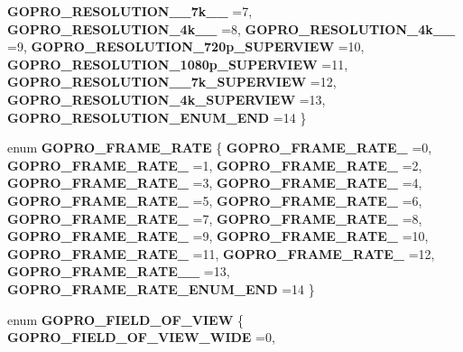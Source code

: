 \begin{DoxyCompactItemize}
\textbf{ G\+O\+P\+R\+O\+\_\+\+R\+E\+S\+O\+L\+U\+T\+I\+O\+N\+\_\+\_\+7k\+\_\+\_} =7, 
\newline
\textbf{ G\+O\+P\+R\+O\+\_\+\+R\+E\+S\+O\+L\+U\+T\+I\+O\+N\+\_\+4k\+\_\+\_} =8, 
\textbf{ G\+O\+P\+R\+O\+\_\+\+R\+E\+S\+O\+L\+U\+T\+I\+O\+N\+\_\+4k\+\_\+\_} =9, 
\textbf{ G\+O\+P\+R\+O\+\_\+\+R\+E\+S\+O\+L\+U\+T\+I\+O\+N\+\_\+720p\+\_\+\+S\+U\+P\+E\+R\+V\+I\+EW} =10, 
\textbf{ G\+O\+P\+R\+O\+\_\+\+R\+E\+S\+O\+L\+U\+T\+I\+O\+N\+\_\+1080p\+\_\+\+S\+U\+P\+E\+R\+V\+I\+EW} =11, 
\newline
\textbf{ G\+O\+P\+R\+O\+\_\+\+R\+E\+S\+O\+L\+U\+T\+I\+O\+N\+\_\+\_\+7k\+\_\+\+S\+U\+P\+E\+R\+V\+I\+EW} =12, 
\textbf{ G\+O\+P\+R\+O\+\_\+\+R\+E\+S\+O\+L\+U\+T\+I\+O\+N\+\_\+4k\+\_\+\+S\+U\+P\+E\+R\+V\+I\+EW} =13, 
\textbf{ G\+O\+P\+R\+O\+\_\+\+R\+E\+S\+O\+L\+U\+T\+I\+O\+N\+\_\+\+E\+N\+U\+M\+\_\+\+E\+ND} =14
 \}
\item 
enum \textbf{ G\+O\+P\+R\+O\+\_\+\+F\+R\+A\+M\+E\+\_\+\+R\+A\+TE} \{ \newline
\textbf{ G\+O\+P\+R\+O\+\_\+\+F\+R\+A\+M\+E\+\_\+\+R\+A\+T\+E\+\_} =0, 
\textbf{ G\+O\+P\+R\+O\+\_\+\+F\+R\+A\+M\+E\+\_\+\+R\+A\+T\+E\+\_} =1, 
\textbf{ G\+O\+P\+R\+O\+\_\+\+F\+R\+A\+M\+E\+\_\+\+R\+A\+T\+E\+\_} =2, 
\textbf{ G\+O\+P\+R\+O\+\_\+\+F\+R\+A\+M\+E\+\_\+\+R\+A\+T\+E\+\_} =3, 
\newline
\textbf{ G\+O\+P\+R\+O\+\_\+\+F\+R\+A\+M\+E\+\_\+\+R\+A\+T\+E\+\_} =4, 
\textbf{ G\+O\+P\+R\+O\+\_\+\+F\+R\+A\+M\+E\+\_\+\+R\+A\+T\+E\+\_} =5, 
\textbf{ G\+O\+P\+R\+O\+\_\+\+F\+R\+A\+M\+E\+\_\+\+R\+A\+T\+E\+\_} =6, 
\textbf{ G\+O\+P\+R\+O\+\_\+\+F\+R\+A\+M\+E\+\_\+\+R\+A\+T\+E\+\_} =7, 
\newline
\textbf{ G\+O\+P\+R\+O\+\_\+\+F\+R\+A\+M\+E\+\_\+\+R\+A\+T\+E\+\_} =8, 
\textbf{ G\+O\+P\+R\+O\+\_\+\+F\+R\+A\+M\+E\+\_\+\+R\+A\+T\+E\+\_} =9, 
\textbf{ G\+O\+P\+R\+O\+\_\+\+F\+R\+A\+M\+E\+\_\+\+R\+A\+T\+E\+\_} =10, 
\textbf{ G\+O\+P\+R\+O\+\_\+\+F\+R\+A\+M\+E\+\_\+\+R\+A\+T\+E\+\_} =11, 
\newline
\textbf{ G\+O\+P\+R\+O\+\_\+\+F\+R\+A\+M\+E\+\_\+\+R\+A\+T\+E\+\_} =12, 
\textbf{ G\+O\+P\+R\+O\+\_\+\+F\+R\+A\+M\+E\+\_\+\+R\+A\+T\+E\+\_\+\_} =13, 
\textbf{ G\+O\+P\+R\+O\+\_\+\+F\+R\+A\+M\+E\+\_\+\+R\+A\+T\+E\+\_\+\+E\+N\+U\+M\+\_\+\+E\+ND} =14
 \}
\item 
enum \textbf{ G\+O\+P\+R\+O\+\_\+\+F\+I\+E\+L\+D\+\_\+\+O\+F\+\_\+\+V\+I\+EW} \{ \textbf{ G\+O\+P\+R\+O\+\_\+\+F\+I\+E\+L\+D\+\_\+\+O\+F\+\_\+\+V\+I\+E\+W\+\_\+\+W\+I\+DE} =0, 

\end{DoxyCompactItemize}
